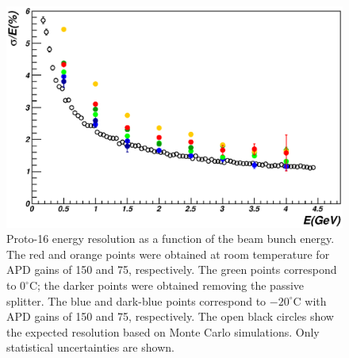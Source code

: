 \begin{figure}
\includegraphics[width=1.0\columnwidth]{./fig/btf_resolution.eps}
\caption{Proto-16 energy resolution as a function of the beam bunch energy. The red and orange points were obtained
  at room temperature for APD gains of 150 and 75, respectively. The green points correspond to $0^\circ$C; the
  darker points were obtained removing the passive splitter. The blue and dark-blue points correspond to
  $-20^\circ$C  with APD gains of 150 and 75, respectively. The open black circles show the expected resolution based
  on Monte Carlo simulations. Only statistical uncertainties are shown.}
\label{fig:btf_resolution}
\end{figure} 
